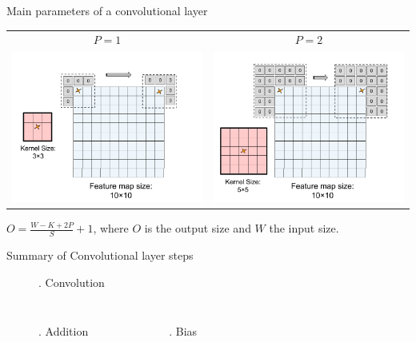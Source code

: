 \documentclass[handout]{beamer}
\begin{document}
\begin{frame}[t]{Main parameters of a convolutional layer}
\begin{itemize}
    {
    {\centering
\begin{tabular}{cc}
    $P=1$ & $P=2$ \\
    \includegraphics[trim={0 0 1.5cm 0}, clip, width=.45\textwidth]{fig/L2/pad3.png}&
    \includegraphics[trim={0 0 1.5cm 0}, clip, width=.45\textwidth]{fig/L2/pad5.png}\\
    \end{tabular}
    }

}
    
\end{itemize}
    \pause
    {\footnotesize
    $O = \frac{W - K +2P}{S} + 1$, where $O$ is the output size and $W$ the input size.
    }
\end{frame}


\begin{frame}{Summary of Convolutional layer steps}
    \begin{figure}
        . Convolution
    \end{figure}
    \pause
    \vspace{-2em}
    \begin{columns}[t]
    \begin{figure}
        . Addition

    \end{figure}
    
       \pause
    \begin{figure}
        . Bias\\
    \end{figure}
    \end{columns}
\end{frame}
\end{document}
